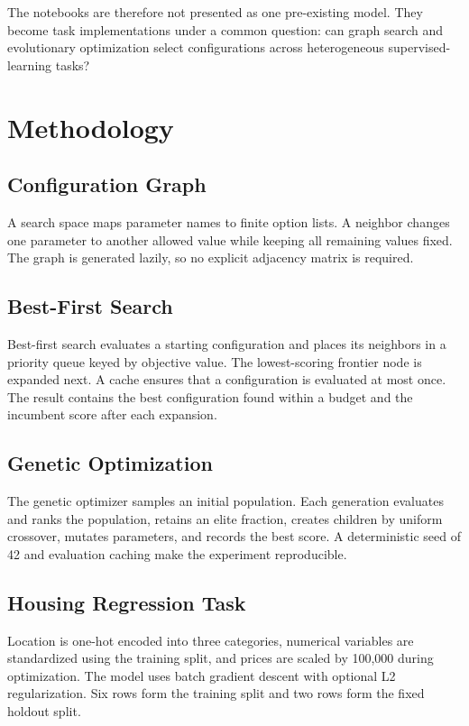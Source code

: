 \documentclass[conference]{IEEEtran}
\begin{document}
The notebooks are therefore not presented as one pre-existing model. They become task implementations under a common question: can graph search and evolutionary optimization select configurations across heterogeneous supervised-learning tasks?

\section{Methodology}
\subsection{Configuration Graph}
A search space maps parameter names to finite option lists. A neighbor changes one parameter to another allowed value while keeping all remaining values fixed. The graph is generated lazily, so no explicit adjacency matrix is required.

\subsection{Best-First Search}
Best-first search evaluates a starting configuration and places its neighbors in a priority queue keyed by objective value. The lowest-scoring frontier node is expanded next. A cache ensures that a configuration is evaluated at most once. The result contains the best configuration found within a budget and the incumbent score after each expansion.

\subsection{Genetic Optimization}
The genetic optimizer samples an initial population. Each generation evaluates and ranks the population, retains an elite fraction, creates children by uniform crossover, mutates parameters, and records the best score. A deterministic seed of 42 and evaluation caching make the experiment reproducible.

\subsection{Housing Regression Task}
Location is one-hot encoded into three categories, numerical variables are standardized using the training split, and prices are scaled by 100,000 during optimization. The model uses batch gradient descent with optional L2 regularization. Six rows form the training split and two rows form the fixed holdout split.
\end{document}
